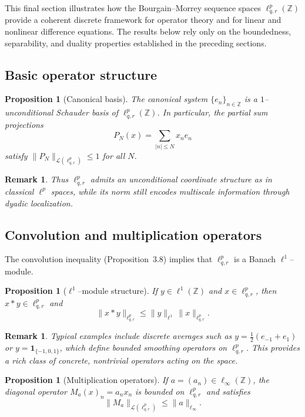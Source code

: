 \documentclass[preprint,12pt]{elsarticle}
\newtheorem{proposition}[theorem]{Proposition}
\newtheorem{remark}[theorem]{Remark}
\begin{document}
This final section illustrates how the Bourgain--Morrey sequence spaces 
$\ell^{p}_{q,r}(\mathbb{Z})$ provide a coherent discrete framework for 
operator theory and for linear and nonlinear difference equations.  
The results below rely only on the boundedness, separability, and duality 
properties established in the preceding sections.

\subsection{Basic operator structure}
\begin{proposition}[Canonical basis]
The canonical system $\{e_n\}_{n\in\mathbb Z}$ is a $1$--unconditional
Schauder basis of $\ell^{p}_{q,r}(\mathbb Z)$.
In particular, the partial sum projections
\[
P_N(x)=\sum_{|n|\le N} x_n e_n
\]
satisfy $\|P_N\|_{\mathcal L(\ell^{p}_{q,r})}\le 1$ for all $N$.
\end{proposition}

\begin{remark}
Thus $\ell^{p}_{q,r}$ admits an unconditional coordinate structure as in classical
$\ell^p$ spaces, while its norm still encodes multiscale information through dyadic localization.
\end{remark}


\subsection{Convolution and multiplication operators}

The convolution inequality (Proposition~3.8) implies that 
$\ell^{p}_{q,r}$ is a Banach $\ell^1$–module.

\begin{proposition}[$\ell^1$–module structure]
If $y\in\ell^1(\mathbb Z)$ and $x\in\ell^{p}_{q,r}$, then $x*y\in\ell^{p}_{q,r}$ and
\[
\|x*y\|_{\ell^{p}_{q,r}}\le \|y\|_{\ell^1}\,\|x\|_{\ell^{p}_{q,r}}.
\]
\end{proposition}

\begin{remark}
Typical examples include discrete averages such as 
$y=\frac12(e_{-1}+e_1)$ or $y=\mathbf{1}_{\{-1,0,1\}}$, 
which define bounded smoothing operators on $\ell^{p}_{q,r}$.  
This provides a rich class of concrete, nontrivial operators acting on the space.
\end{remark}

\begin{proposition}[Multiplication operators]
If $a=(a_n)\in\ell_\infty(\mathbb Z)$, the diagonal operator 
$M_a(x)_n=a_nx_n$ is bounded on $\ell^{p}_{q,r}$ and satisfies
\[
\|M_a\|_{\mathcal L(\ell^{p}_{q,r})}\le \|a\|_{\ell_\infty}.
\]
\end{proposition}
\end{document}
